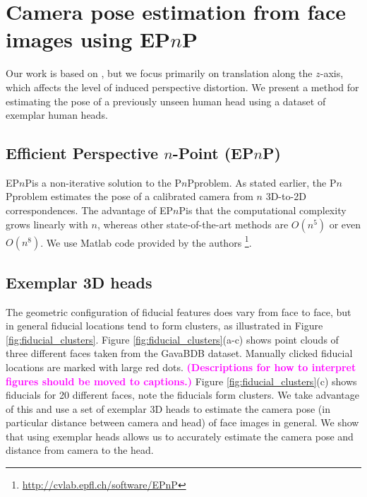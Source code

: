 \documentclass[runningheads]{llncs}
\newcommand {\ericnote} [1] {{\bf \textcolor{magenta}{(#1)}}}
\newcommand {\PnP} {P$n$P}
\newcommand {\EPnP} {EP$n$P}
\begin{document}
\section{Camera pose estimation from face images using \EPnP}

Our work is based on \cite{ohayon2006robust}, but we focus primarily on translation along the $z$-axis, which affects the level of induced perspective distortion.  
We present a method for estimating the pose of a previously unseen human head using a dataset of exemplar human heads. 

\subsection{Efficient Perspective $n$-Point (\EPnP)}
\EPnP is a non-iterative solution to the \PnP problem.  
As stated earlier, the \PnP problem estimates the pose of a calibrated camera from $n$ 3D-to-2D correspondences.  
The advantage of \EPnP is that the computational complexity grows linearly with $n$, whereas other state-of-the-art methods are $O(n^5)$ or even $O(n^8)$.  
We use Matlab code provided by the authors \footnote{\url{http://cvlab.epfl.ch/software/EPnP}}.

\subsection{Exemplar 3D heads}
The geometric configuration of fiducial features does vary from face to face, but in general fiducial locations tend to form clusters, as illustrated in Figure \ref{fig:fiducial_clusters}.  
Figure \ref{fig:fiducial_clusters}(a-c) shows point clouds of three different faces taken from the GavaBDB \cite{moreno2004gavabdb} dataset. 
Manually clicked fiducial locations are marked with large red dots.
\ericnote{Descriptions for how to interpret figures should be moved to captions.}
Figure \ref{fig:fiducial_clusters}(c) shows fiducials for 20 different faces, note the fiducials form clusters.  
We take advantage of this and use a set of exemplar 3D heads to estimate the camera pose (in particular distance between camera and head) of face images in general. 
We show that using exemplar heads allows us to accurately estimate the camera pose and distance from camera to the head.
\end{document}
